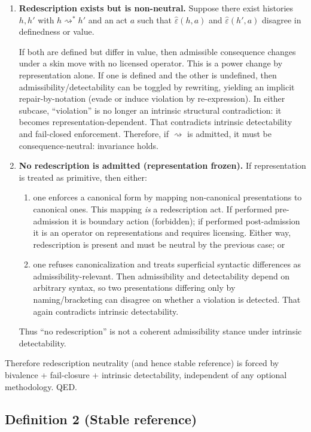 \documentclass[12pt]{article}
\theoremstyle{plain}
\begin{document}
\begin{enumerate}[leftmargin=*]
\item \textbf{Redescription exists but is non-neutral.} Suppose there exist histories $h,h'$ with $h\rightsquigarrow^* h'$ and an act $a$ such that $\widehat\varepsilon(h,a)$ and $\widehat\varepsilon(h',a)$ disagree in definedness or value.

If both are defined but differ in value, then admissible consequence changes under a skin move with no licensed operator. This is a power change by representation alone. If one is defined and the other is undefined, then admissibility/detectability can be toggled by rewriting, yielding an implicit repair-by-notation (evade or induce violation by re-expression). In either subcase, ``violation'' is no longer an intrinsic structural contradiction: it becomes representation-dependent. That contradicts intrinsic detectability and fail-closed enforcement. Therefore, if $\rightsquigarrow$ is admitted, it must be consequence-neutral: invariance holds.

\item \textbf{No redescription is admitted (representation frozen).} If representation is treated as primitive, then either:
\begin{enumerate}[leftmargin=*]
\item one enforces a canonical form by mapping non-canonical presentations to canonical ones. This mapping \emph{is} a redescription act. If performed pre-admission it is boundary action (forbidden); if performed post-admission it is an operator on representations and requires licensing. Either way, redescription is present and must be neutral by the previous case; or
\item one refuses canonicalization and treats superficial syntactic differences as admissibility-relevant. Then admissibility and detectability depend on arbitrary syntax, so two presentations differing only by naming/bracketing can disagree on whether a violation is detected. That again contradicts intrinsic detectability.
\end{enumerate}
Thus ``no redescription'' is not a coherent admissibility stance under intrinsic detectability.
\end{enumerate}

Therefore redescription neutrality (and hence stable reference) is forced by bivalence + fail-closure + intrinsic detectability, independent of any optional methodology. QED.


\subsection{Definition 2 (Stable reference)}
\end{document}
